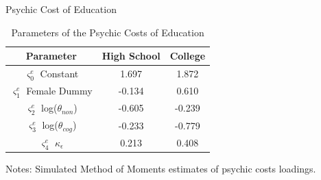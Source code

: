 \documentclass{beamer}
\begin{document}
\begin{frame}{Psychic Cost of Education}
\begin {table}[H]
\caption {Parameters of the Psychic Costs of Education} \label{tab:title} 
\begin{center}
  \begin{tabular}{c |  c  c    }
      \hline
Parameter & High School & College\\\hline
 $\varsigma_0^e$ Constant & 1.697& 1.872\\
 $\varsigma_1^e$ Female Dummy &-0.134& 0.610\\
 $\varsigma_2^e$ log($\theta_{non}$) &-0.605& -0.239\\
 $\varsigma_3^e$ log($\theta_{cog}$) &-0.233 &-0.779\\
 $\varsigma_4^e$ $\kappa_{\epsilon}$ & 0.213 &0.408 \\\hline

\end{tabular}
\end{center}
\tiny{Notes: Simulated Method of Moments estimates of psychic costs loadings.  }
\end{table}

\begin{itemize}


\end{itemize}
\end{frame}
\end{document}
